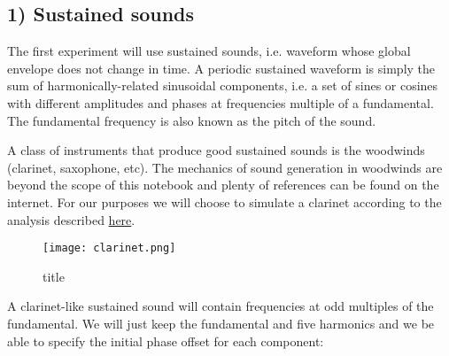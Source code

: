 \documentclass[11pt]{article}
\makeatletter
\def\maxwidth{\ifdim\Gin@nat@width>\linewidth\linewidth
    \else\Gin@nat@width\fi}
\let\Oldincludegraphics\includegraphics
\renewcommand{\includegraphics}[1]{\Oldincludegraphics[width=.8\maxwidth]{#1}}
\makeatother
\begin{document}
    \subsection{1) Sustained sounds}\label{sustained-sounds}

The first experiment will use sustained sounds, i.e. waveform whose
global envelope does not change in time. A periodic sustained waveform
is simply the sum of harmonically-related sinusoidal components, i.e. a
set of sines or cosines with different amplitudes and phases at
frequencies multiple of a fundamental. The fundamental frequency is also
known as the pitch of the sound.

A class of instruments that produce good sustained sounds is the
woodwinds (clarinet, saxophone, etc). The mechanics of sound generation
in woodwinds are beyond the scope of this notebook and plenty of
references can be found on the internet. For our purposes we will choose
to simulate a clarinet according to the analysis described
\href{http://www.phy.mtu.edu/~suits/clarinet.html}{here}.

\begin{figure}
\centering
\texttt{[image: clarinet.png]}
\caption{title}
\end{figure}

A clarinet-like sustained sound will contain frequencies at odd
multiples of the fundamental. We will just keep the fundamental and five
harmonics and we be able to specify the initial phase offset for each
component:
\end{document}
